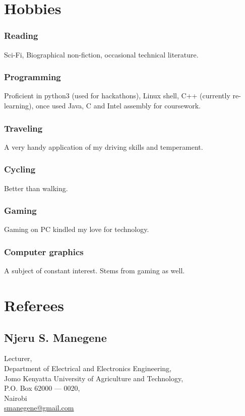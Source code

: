 \documentclass[a4paper]{article}
\begin{document}
\section{Hobbies}
\subsubsection{Reading}
Sci-Fi, Biographical non-fiction, occasional technical literature.
\subsubsection{Programming}
Proficient in python3 (used for hackathons), Linux shell, C++ (currently re-learning), once used Java, C and Intel assembly for coursework.
\subsubsection{Traveling}
A very handy application of my driving skills and temperament.
\subsubsection{Cycling}
Better than walking.
\subsubsection{Gaming}
Gaming on PC kindled my love for technology.
\subsubsection{Computer graphics}
A subject of constant interest. Stems from gaming as well.

\section{Referees}
\subsection{Njeru S. Manegene}
Lecturer,\\
Department of Electrical and Electronics Engineering,\\
Jomo Kenyatta University of Agriculture and Technology,\\
P.O. Box 62000 --- 0020,\\
Nairobi\\
\href{mailto:smanegene@gmail.com}{\ttfamily\color{blue!80!black!90}smanegene@gmail.com}
\end{document}
